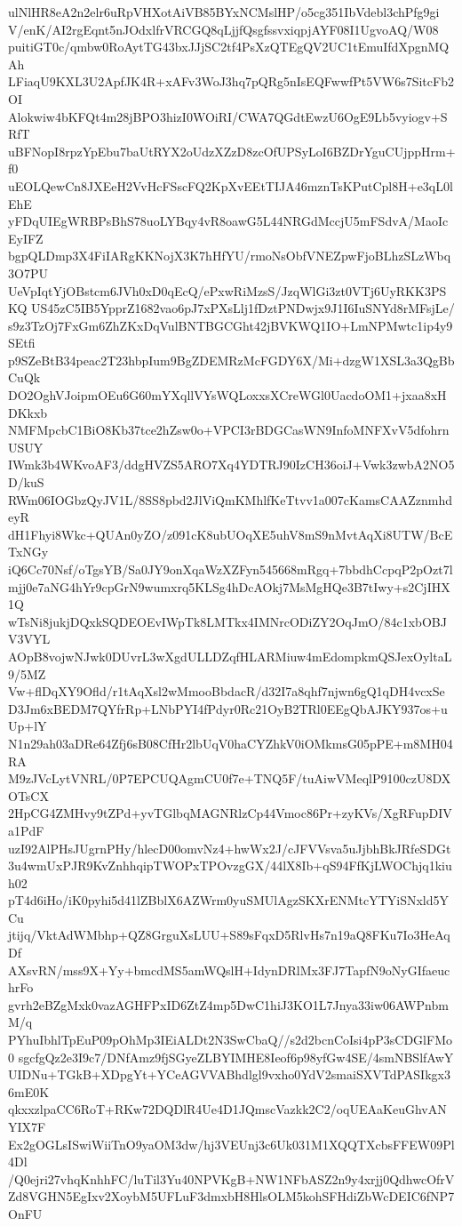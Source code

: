ulNlHR8eA2n2elr6uRpVHXotAiVB85BYxNCMslHP/o5cg351IbVdebl3chPfg9gi
V/enK/AI2rgEqnt5nJOdxlfrVRCGQ8qLjjfQsgfssvxiqpjAYF08I1UgvoAQ/W08
puitiGT0c/qmbw0RoAytTG43bxJJjSC2tf4PsXzQTEgQV2UC1tEmuIfdXpgnMQAh
LFiaqU9KXL3U2ApfJK4R+xAFv3WoJ3hq7pQRg5nIsEQFwwfPt5VW6s7SitcFb2OI
Alokwiw4bKFQt4m28jBPO3hizI0WOiRI/CWA7QGdtEwzU6OgE9Lb5vyiogv+SRfT
uBFNopI8rpzYpEbu7baUtRYX2oUdzXZzD8zcOfUPSyLoI6BZDrYguCUjppHrm+f0
uEOLQewCn8JXEeH2VvHcFSscFQ2KpXvEEtTIJA46mznTsKPutCpl8H+e3qL0lEhE
yFDqUIEgWRBPsBhS78uoLYBqy4vR8oawG5L44NRGdMccjU5mFSdvA/MaoIcEyIFZ
bgpQLDmp3X4FiIARgKKNojX3K7hHfYU/rmoNsObfVNEZpwFjoBLhzSLzWbq3O7PU
UeVpIqtYjOBstcm6JVh0xD0qEcQ/ePxwRiMzsS/JzqWlGi3zt0VTj6UyRKK3PSKQ
US45zC5IB5YpprZ1682vao6pJ7xPXsLlj1fDztPNDwjx9J1I6IuSNYd8rMFsjLe/
s9z3TzOj7FxGm6ZhZKxDqVulBNTBGCGht42jBVKWQ1IO+LmNPMwtc1ip4y9SEtfi
p9SZeBtB34peac2T23hbpIum9BgZDEMRzMcFGDY6X/Mi+dzgW1XSL3a3QgBbCuQk
DO2OghVJoipmOEu6G60mYXqllVYsWQLoxxsXCreWGl0UacdoOM1+jxaa8xHDKkxb
NMFMpcbC1BiO8Kb37tce2hZsw0o+VPCI3rBDGCasWN9InfoMNFXvV5dfohrnUSUY
IWmk3b4WKvoAF3/ddgHVZS5ARO7Xq4YDTRJ90IzCH36oiJ+Vwk3zwbA2NO5D/kuS
RWm06IOGbzQyJV1L/8SS8pbd2JlViQmKMhlfKeTtvv1a007cKamsCAAZznmhdeyR
dH1Fhyi8Wkc+QUAn0yZO/z091cK8ubUOqXE5uhV8mS9nMvtAqXi8UTW/BcETxNGy
iQ6Cc70Nsf/oTgsYB/Sa0JY9onXqaWzXZFyn545668mRgq+7bbdhCcpqP2pOzt7l
mjj0e7aNG4hYr9cpGrN9wumxrq5KLSg4hDcAOkj7MsMgHQe3B7tIwy+s2CjIHX1Q
wTsNi8jukjDQxkSQDEOEvIWpTk8LMTkx4IMNrcODiZY2OqJmO/84c1xbOBJV3VYL
AOpB8vojwNJwk0DUvrL3wXgdULLDZqfHLARMiuw4mEdompkmQSJexOyltaL9/5MZ
Vw+flDqXY9Ofld/r1tAqXsl2wMmooBbdacR/d32I7a8qhf7njwn6gQ1qDH4vcxSe
D3Jm6xBEDM7QYfrRp+LNbPYI4fPdyr0Rc21OyB2TRl0EEgQbAJKY937os+uUp+lY
N1n29ah03aDRe64Zfj6sB08CfHr2lbUqV0haCYZhkV0iOMkmsG05pPE+m8MH04RA
M9zJVcLytVNRL/0P7EPCUQAgmCU0f7e+TNQ5F/tuAiwVMeqlP9100czU8DXOTsCX
2HpCG4ZMHvy9tZPd+yvTGlbqMAGNRlzCp44Vmoc86Pr+zyKVs/XgRFupDIVa1PdF
uzI92AlPHsJUgrnPHy/hlecD00omvNz4+hwWx2J/cJFVVsva5uJjbhBkJRfeSDGt
3u4wmUxPJR9KvZnhhqipTWOPxTPOvzgGX/44lX8Ib+qS94FfKjLWOChjq1kiuh02
pT4d6iHo/iK0pyhi5d41lZBblX6AZWrm0yuSMUlAgzSKXrENMtcYTYiSNxld5YCu
jtijq/VktAdWMbhp+QZ8GrguXsLUU+S89sFqxD5RlvHs7n19aQ8FKu7Io3HeAqDf
AXsvRN/mss9X+Yy+bmcdMS5amWQslH+IdynDRlMx3FJ7TapfN9oNyGIfaeuchrFo
gvrh2eBZgMxk0vazAGHFPxID6ZtZ4mp5DwC1hiJ3KO1L7Jnya33iw06AWPnbmM/q
PYhuIbhlTpEuP09pOhMp3IEiALDt2N3SwCbaQ//s2d2bcnCoIsi4pP3sCDGlFMo0
sgcfgQz2e3I9c7/DNfAmz9fjSGyeZLBYIMHE8Ieof6p98yfGw4SE/4smNBSlfAwY
UIDNu+TGkB+XDpgYt+YCeAGVVABhdlgl9vxho0YdV2smaiSXVTdPASIkgx36mE0K
qkxxzlpaCC6RoT+RKw72DQDlR4Ue4D1JQmscVazkk2C2/oqUEAaKeuGhvANYIX7F
Ex2gOGLsISwiWiiTnO9yaOM3dw/hj3VEUnj3c6Uk031M1XQQTXcbsFFEW09Pl4Dl
/Q0ejri27vhqKnhhFC/luTil3Yu40NPVKgB+NW1NFbASZ2n9y4xrjj0QdhwcOfrV
Zd8VGHN5EgIxv2XoybM5UFLuF3dmxbH8HlsOLM5kohSFHdiZbWcDEIC6fNP7OnFU
